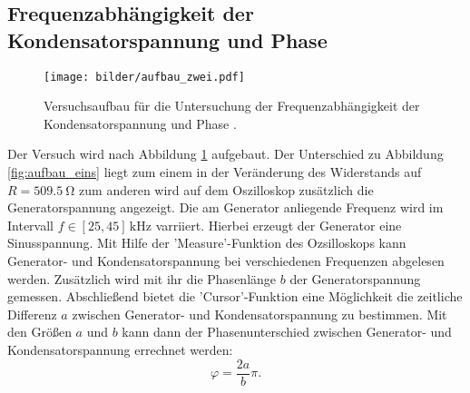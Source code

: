\subsection{Frequenzabhängigkeit der Kondensatorspannung und Phase}
\begin{figure}
  \centering
  \texttt{[image: bilder/aufbau\_zwei.pdf]}
  \caption{Versuchsaufbau für die Untersuchung der Frequenzabhängigkeit der Kondensatorspannung und Phase \cite{anleitung354}. }
  \label{fig:aufbau_zwei}
\end{figure}
Der Versuch wird nach Abbildung \ref{fig:aufbau_zwei} aufgebaut.
Der Unterschied zu Abbildung \ref{fig:aufbau_eins} liegt zum einem
in der Veränderung des Widerstands auf $R=\SI{509.5}{\ohm}$ zum anderen wird
auf dem Oszilloskop zusätzlich die Generatorspannung angezeigt.
Die am Generator anliegende Frequenz wird im Intervall $f\in\left[25,45\right]\,\si{\kilo\hertz}$
varriiert. Hierbei erzeugt der Generator eine Sinusspannung. Mit Hilfe der 'Measure'-Funktion des Ozsilloskops %
kann Generator- und Kondensatorspannung bei verschiedenen Frequenzen %
abgelesen werden. Zusätzlich wird mit ihr die Phasenlänge $b$ der Generatorspannung
gemessen. Abschließend bietet die 'Cursor'-Funktion eine Möglichkeit %
die zeitliche Differenz $a$ zwischen Generator- und Kondensatorspannung zu
bestimmen.
Mit den Größen $a$ und $b$ kann dann der Phasenunterschied zwischen
Generator- und Kondensatorspannung errechnet werden:
\begin{equation}
  \label{eq:phasen_unterschied}
  \varphi=\frac{2a}{b}\pi.
\end{equation}
